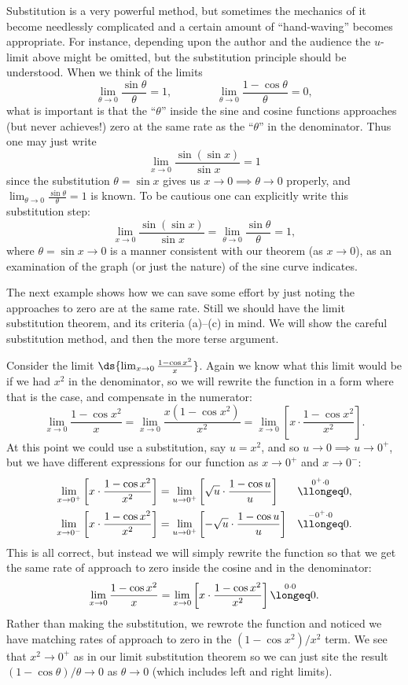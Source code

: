 Substitution is a very powerful method, but sometimes the mechanics
of it become needlessly complicated and a certain amount of 
``hand-waving'' becomes appropriate.  For instance, depending upon the
author and the audience the $u$-limit above might be omitted,
but the substitution principle should be understood.
When we think of the limits
$$\lim_{\theta\to0}\frac{\sin\theta}{\theta}=1,
\qquad\qquad
\lim_{\theta\to0}\frac{1-\cos\theta}{\theta}=0,$$
what is important is that the ``$\theta$''  inside the sine and cosine
functions approaches (but never achieves!) zero at the same rate
as the ``$\theta$'' in the denominator.  Thus one may just write
$$\lim_{x\to0}\frac{\sin(\sin x)}{\sin x}
=1$$
since the substitution $\theta=\sin x$ gives us
$x\to0\implies\theta\to0$ properly, and $\lim_{\theta\to0}
\frac{\sin\theta}{\theta}=1$ is known.  
To be cautious one can explicitly write this substitution step:
$$\lim_{x\to0}\frac{\sin(\sin x)}{\sin x}
=\lim_{\theta\to0}\frac{\sin\theta}{\theta}=1,$$
where $\theta=\sin x\to0$ is a manner consistent with 
our theorem (as $x\to0$), as an examination of the graph (or just the nature)
of the sine curve indicates.

The next example shows how we can save some effort
by just noting the approaches to zero are at the same rate.
Still we should have the limit substitution theorem, and its
criteria (a)--(c) in mind.
We will show the careful substitution method, and then the
more terse argument.

\bex Consider the limit $\ds{\lim_{x\to0}\frac{1-\cos x^2}{x}}$.  Again
we know what this limit would be if we had $x^2$ in the denominator,
so we will rewrite the function in a form where that is the case,
and compensate in the numerator:
$$\lim_{x\to0}\frac{1-\cos x^2}{x}
  =\lim_{x\to0}\frac{x(1-\cos x^2)}{x^2}
  =\lim_{x\to0}\left[x\cdot\frac{1-\cos x^2}{x^2}\right].$$
At this point we could use a substitution, say $u=x^2$,
and so $u\to0\implies u\to0^+$, but we have different
expressions for our function as $x\to0^+$ and $x\to0^-$:
\begin{alignat*}{2}
\lim_{x\to0^+}\left[x\cdot\frac{1-\cos x^2}{x^2}\right]
 &=\lim_{u\to0^+}\left[\sqrt{u}\cdot\frac{1-\cos u}u\right]
  &&\overset{0^+\cdot0}{\llongeq}0,\\
\lim_{x\to0^-}\left[x\cdot\frac{1-\cos x^2}{x^2}\right]
 &=\lim_{u\to0^+}\left[-\sqrt{u}\cdot\frac{1-\cos u}u\right]
  &&\overset{-0^+\cdot0}{\llongeq}0.
\end{alignat*}
This is all correct, but instead we will simply rewrite the 
function so that we get the same rate of approach to zero
inside the cosine and in the denominator:
$$\lim_{x\to0}\frac{1-\cos x^2}{x}
  =\lim_{x\to0}\left[x\cdot\frac{1-\cos x^2}{x^2}\right]
  \overset{0\cdot0}{\longeq}0.$$
Rather than making the substitution, we rewrote the function
and noticed we have matching rates of approach to zero
in the $(1-\cos x^2)/x^2$ term.  We see that $x^2\to0^+$
as in our limit substitution theorem so we can just site the result
$(1-\cos\theta)/\theta\to0$ as $\theta\to0$ (which includes
left and right limits).
\eex

